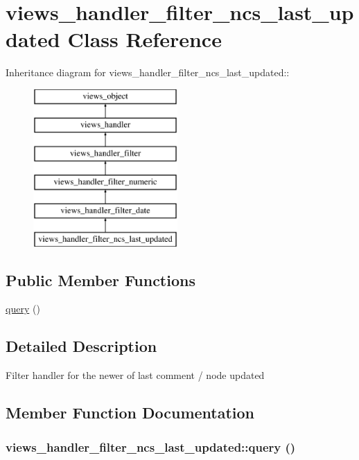 \hypertarget{classviews__handler__filter__ncs__last__updated}{
\section{views\_\-handler\_\-filter\_\-ncs\_\-last\_\-updated Class Reference}
\label{classviews__handler__filter__ncs__last__updated}
}
Inheritance diagram for views\_\-handler\_\-filter\_\-ncs\_\-last\_\-updated::\begin{figure}[H]
\begin{center}
\leavevmode
\includegraphics[height=6cm]{classviews__handler__filter__ncs__last__updated}
\end{center}
\end{figure}
\subsection*{Public Member Functions}
\begin{CompactItemize}
\item 
\hyperlink{classviews__handler__filter__ncs__last__updated_fdcfcb18506212eb4b5df8b19971ff48}{query} ()
\end{CompactItemize}


\subsection{Detailed Description}
Filter handler for the newer of last comment / node updated 

\subsection{Member Function Documentation}
\hypertarget{classviews__handler__filter__ncs__last__updated_fdcfcb18506212eb4b5df8b19971ff48}{
\subsubsection[{query}]{\setlength{\rightskip}{0pt plus 5cm}views\_\-handler\_\-filter\_\-ncs\_\-last\_\-updated::query ()}}
\label{classviews__handler__filter__ncs__last__updated_fdcfcb18506212eb4b5df8b19971ff48}


